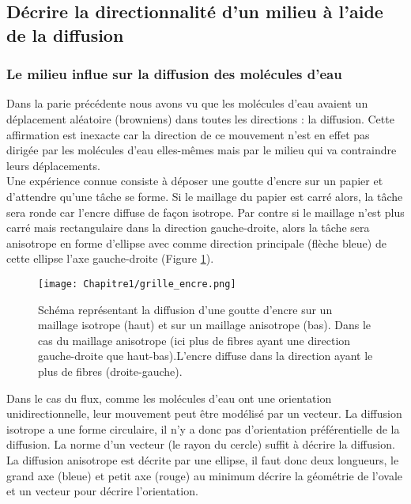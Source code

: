  \subsection{Décrire la directionnalité d’un milieu à l’aide de la diffusion}

\subsubsection{Le milieu influe sur la diffusion des molécules d’eau}

Dans la parie précédente nous avons vu que les molécules d’eau avaient un déplacement aléatoire (browniens) dans toutes les directions : la diffusion. Cette affirmation est inexacte car la direction de ce mouvement n’est en effet pas dirigée par les molécules d’eau elles-mêmes mais par le milieu qui va contraindre leurs déplacements. \\

Une expérience connue consiste à déposer une goutte d’encre sur un papier et d’attendre qu’une tâche se forme. Si le maillage du papier est carré alors, la tâche sera ronde car l’encre diffuse de façon isotrope. Par contre si le maillage n’est plus carré mais rectangulaire dans la direction gauche-droite, alors la tâche sera anisotrope en forme d’ellipse avec comme direction principale (flèche bleue) de cette ellipse l’axe gauche-droite (Figure \ref{fig:grille_encre}). \\

\begin{figure}[!htbp]
  \begin{center}
    \texttt{[image: Chapitre1/grille\_encre.png]}
     \end{center}
    \caption{ Schéma représentant la diffusion d’une goutte d’encre sur un maillage isotrope (haut) et sur un maillage anisotrope (bas). Dans le cas du maillage anisotrope (ici plus de fibres ayant une direction gauche-droite que haut-bas).L’encre diffuse dans la direction ayant le plus de fibres (droite-gauche).}
  \label{fig:grille_encre}
\end{figure}

Dans le cas du flux, comme les molécules d’eau ont une orientation unidirectionnelle, leur mouvement peut être modélisé par un vecteur. La diffusion isotrope a une forme circulaire, il n’y a donc pas d’orientation préférentielle de la diffusion. La norme d’un vecteur (le rayon du cercle) suffit à décrire la diffusion. La diffusion anisotrope est décrite par une ellipse, il faut donc deux longueurs, le grand axe (bleue) et petit axe (rouge) au minimum décrire la géométrie de l’ovale et un vecteur pour décrire l’orientation. \\

